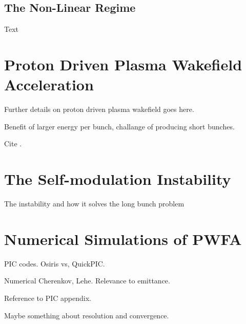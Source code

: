 \subsection{The Non-Linear Regime}
\label{Int:PWFA:NLin}

Text

\section{Proton Driven Plasma Wakefield Acceleration}
\label{Int:PDPWFA}

Further details on proton driven plasma wakefield goes here.

Benefit of larger energy per bunch, challange of producing short bunches.

Cite \cite{adli:2016-1}.

\section{The Self-modulation Instability}
\label{Int:SMI}

The instability and how it solves the long bunch problem

\section{Numerical Simulations of PWFA}
\label{Int:Sim}

PIC codes. Osiris vs, QuickPIC.

Numerical Cherenkov, Lehe. Relevance to emittance.

Reference to PIC appendix.

Maybe something about resolution and convergence.

